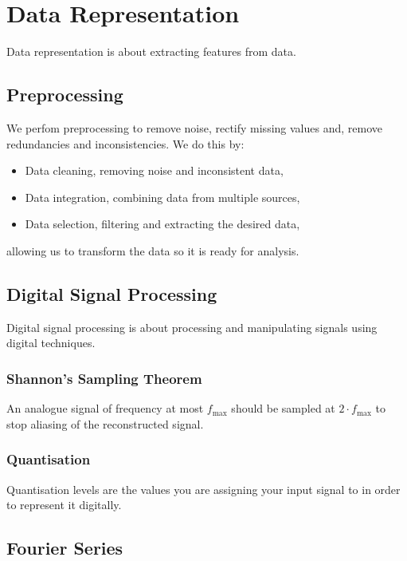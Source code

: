 \section{Data Representation}

Data representation is about extracting
features from data.

\subsection{Preprocessing}

We perfom preprocessing to remove
noise, rectify missing values and, remove
redundancies and inconsistencies.
We do this by: \begin{itemize}
    \item Data cleaning, removing noise and
    inconsistent data,
    \item Data integration, combining data
    from multiple sources,
    \item Data selection, filtering and
    extracting the desired data,
\end{itemize} allowing us to transform
the data so it is ready for analysis.

\subsection{Digital Signal Processing}

Digital signal processing is about processing
and manipulating signals using digital
techniques.

\subsubsection{Shannon's Sampling Theorem}

An analogue signal of frequency at most 
$f_{\text{max}}$ should be sampled at 
$2 \cdot f_{\text{max}}$ to stop aliasing
of the reconstructed signal.

\subsubsection{Quantisation}

Quantisation levels are the values you
are assigning your input signal to in
order to represent it digitally.

\subsection{Fourier Series}

